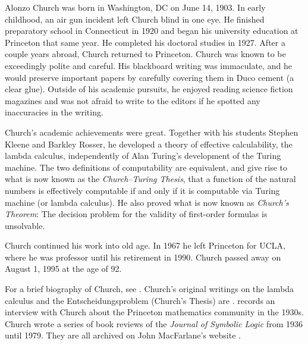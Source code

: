 \documentclass[../../../include/open-logic-section]{subfiles}
\begin{document}



Alonzo Church was born in Washington, DC on June 14, 1903.  In early
childhood, an air gun incident left Church blind in one eye. He
finished preparatory school in Connecticut in 1920 and began his
university education at Princeton that same year. He completed his
doctoral studies in 1927. After a couple years abroad, Church returned
to Princeton. Church was known to be exceedingly polite and careful. His
blackboard writing was immaculate, and he would preserve important
papers by carefully covering them in Duco cement (a clear
glue). Outside of his academic pursuits, he enjoyed reading science
fiction magazines and was not afraid to write to the editors if he
spotted any inaccuracies in the writing.

Church's academic achievements were great.  Together with his students
Stephen Kleene and Barkley Rosser, he developed a theory of effective
calculability, the lambda calculus, independently of Alan Turing's
development of the Turing machine. The two definitions of
computability are equivalent, and give rise to what is now known as
the \emph{Church--Turing Thesis}, that a function of the natural
numbers is effectively computable if and only if it is computable via
Turing machine (or lambda calculus). He also proved what is now known
as \emph{Church's Theorem}: The decision problem for the validity of
first-order formulas is unsolvable.

Church continued his work into old age. In 1967 he left Princeton for
UCLA, where he was professor until his retirement in 1990. Church
passed away on August 1, 1995 at the age of 92.

\begin{reading} 
For a brief biography of Church, see \citet{EndertonND}.  Church's
original writings on the lambda calculus and the Entscheidungsproblem
(Church's Thesis) are \citet{Church1936,Church1936a}.
\citet{Aspray1984} records an interview with Church about the
Princeton mathematics community in the 1930s.
Church wrote a series of book reviews of the \emph{Journal of
Symbolic Logic} from 1936 until 1979. They are all archived on John
MacFarlane's website \citep{MacFarlane2015}.
\end{reading} 
\end{document}
